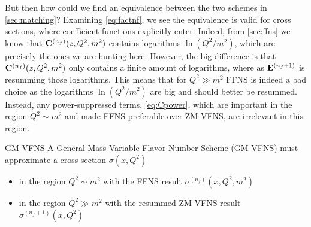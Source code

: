 But then how could we find an equivalence between the two schemes in \cref{sec:matching}?
Examining \cref{eq:factnf}, we see the equivalence is valid for cross sections, where coefficient functions explicitly enter.
Indeed, from \cref{sec:ffns} we know that $\vb C^{(n_f)}(z,Q^2,m^2)$ contains logarithms $\ln(Q^2/m^2)$, which are precisely the ones we are hunting here.
However, the big difference is that $\vb C^{(n_f)}(z,Q^2,m^2)$ only contains a finite amount of logarithms, where as $\vb E^{(n_f+1)}$ is resumming those logarithms.
This means that for $Q^2 \gg m^2$ FFNS is indeed a bad choice as the logarithms $\ln(Q^2/m^2)$ are big and should better be resummed.
Instead, any power-suppressed terms, \cref{eq:Cpower}, which are important in the region $Q^2 \sim m^2$ and made FFNS preferable over ZM-VFNS, are irrelevant in this region.

\begin{conclusionbox}[label=box:gmvfns]{GM-VFNS}
    A General Mass-Variable Flavor Number Scheme (GM-VFNS) must approximate a cross section $\sigma(x,Q^2)$
    \begin{itemize}
        \item in the region $Q^2 \sim m^2$ with the FFNS result $\sigma^{(n_f)}(x,Q^2,m^2)$
        \item in the region $Q^2 \gg m^2$ with the resummed ZM-VFNS result $\sigma^{(n_f+1)}(x,Q^2)$
    \end{itemize}
\end{conclusionbox}


